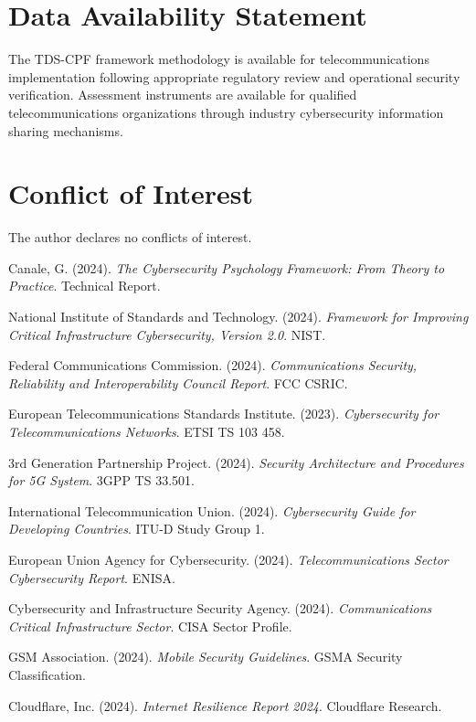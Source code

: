 \documentclass[10pt, twocolumn]{article}
\begin{document}
\section*{Data Availability Statement}

The TDS-CPF framework methodology is available for telecommunications implementation following appropriate regulatory review and operational security verification. Assessment instruments are available for qualified telecommunications organizations through industry cybersecurity information sharing mechanisms.

\section*{Conflict of Interest}

The author declares no conflicts of interest.

\begin{thebibliography}{99}

Canale, G. (2024). \textit{The Cybersecurity Psychology Framework: From Theory to Practice}. Technical Report.

National Institute of Standards and Technology. (2024). \textit{Framework for Improving Critical Infrastructure Cybersecurity, Version 2.0}. NIST.

Federal Communications Commission. (2024). \textit{Communications Security, Reliability and Interoperability Council Report}. FCC CSRIC.

European Telecommunications Standards Institute. (2023). \textit{Cybersecurity for Telecommunications Networks}. ETSI TS 103 458.

3rd Generation Partnership Project. (2024). \textit{Security Architecture and Procedures for 5G System}. 3GPP TS 33.501.

International Telecommunication Union. (2024). \textit{Cybersecurity Guide for Developing Countries}. ITU-D Study Group 1.

European Union Agency for Cybersecurity. (2024). \textit{Telecommunications Sector Cybersecurity Report}. ENISA.

Cybersecurity and Infrastructure Security Agency. (2024). \textit{Communications Critical Infrastructure Sector}. CISA Sector Profile.

GSM Association. (2024). \textit{Mobile Security Guidelines}. GSMA Security Classification.

Cloudflare, Inc. (2024). \textit{Internet Resilience Report 2024}. Cloudflare Research.

\end{thebibliography}
\end{document}
